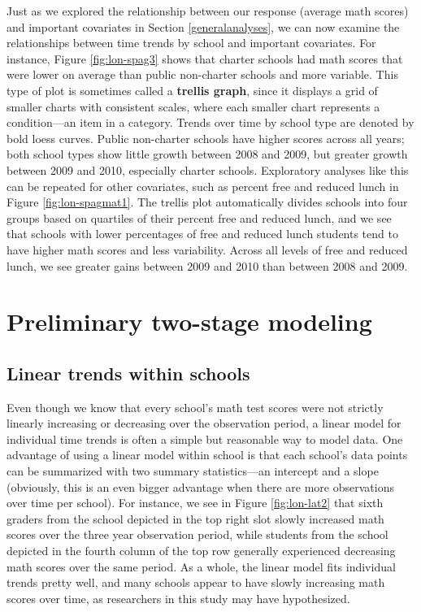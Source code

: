 \documentclass[
]{krantz}
\begin{document}
Just as we explored the relationship between our response (average math scores) and important covariates in Section \ref{generalanalyses}, we can now examine the relationships between time trends by school and important covariates. For instance, Figure \ref{fig:lon-spag3} shows that charter schools had math scores that were lower on average than public non-charter schools and more variable. This type of plot is sometimes called a \textbf{trellis graph},  since it displays a grid of smaller charts with consistent scales, where each smaller chart represents a condition---an item in a category. Trends over time by school type are denoted by bold loess curves. Public non-charter schools have higher scores across all years; both school types show little growth between 2008 and 2009, but greater growth between 2009 and 2010, especially charter schools. Exploratory analyses like this can be repeated for other covariates, such as percent free and reduced lunch in Figure \ref{fig:lon-spagmat1}. The trellis plot automatically divides schools into four groups based on quartiles of their percent free and reduced lunch, and we see that schools with lower percentages of free and reduced lunch students tend to have higher math scores and less variability. Across all levels of free and reduced lunch, we see greater gains between 2009 and 2010 than between 2008 and 2009.

\hypertarget{twostage9}{%
\section{Preliminary two-stage modeling}\label{twostage9}}

\hypertarget{lineartwostage}{%
\subsection{Linear trends within schools}\label{lineartwostage}}

Even though we know that every school's math test scores were not strictly linearly increasing or decreasing over the observation period, a linear model for individual time trends is often a simple but reasonable way to model data. One advantage of using a linear model within school is that each school's data points can be summarized with two summary statistics---an intercept and a slope (obviously, this is an even bigger advantage when there are more observations over time per school). For instance, we see in Figure \ref{fig:lon-lat2} that sixth graders from the school depicted in the top right slot slowly increased math scores over the three year observation period, while students from the school depicted in the fourth column of the top row generally experienced decreasing math scores over the same period. As a whole, the linear model fits individual trends pretty well, and many schools appear to have slowly increasing math scores over time, as researchers in this study may have hypothesized.
\end{document}

